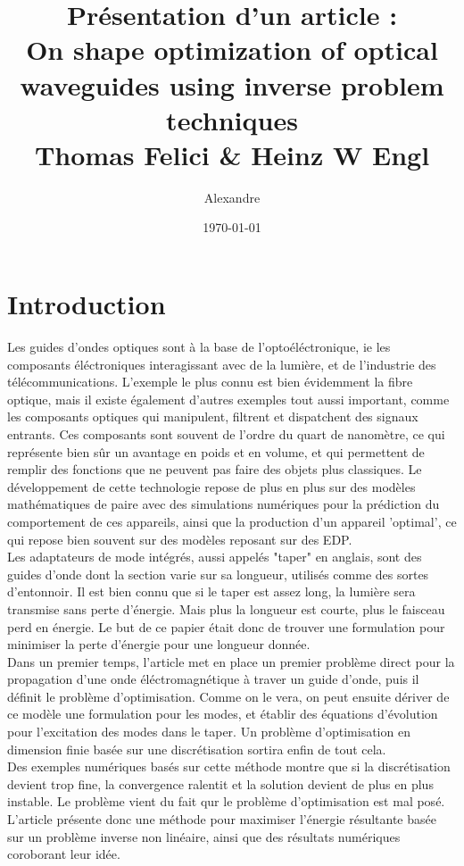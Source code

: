 \documentclass{article}
\title{Pr\'esentation d'un article : \\ On shape optimization of optical waveguides using inverse problem techniques\\\small{Thomas Felici \& Heinz W Engl}}
\author{Alexandre \bsc{Vieira}}
\date{\today}
\begin{document}
\maketitle
\tableofcontents

\newpage

\section*{Introduction}
Les guides d'ondes optiques sont à la base de l'optoéléctronique, ie les composants éléctroniques interagissant avec de la lumière, et de l'industrie des télécommunications. L'exemple le plus connu est bien évidemment la fibre optique, mais il existe également d'autres exemples tout aussi important, comme les composants optiques qui manipulent, filtrent et dispatchent des signaux entrants. Ces composants sont souvent de l'ordre du quart de nanomètre, ce qui représente bien sûr un avantage en poids et en volume, et qui permettent de remplir des fonctions que ne peuvent pas faire des objets plus classiques. Le développement de cette technologie repose de plus en plus sur des modèles mathématiques de paire avec des simulations numériques pour la prédiction du comportement de ces appareils, ainsi que la production d'un appareil 'optimal', ce qui repose bien souvent sur des modèles reposant sur des EDP.\\
Les adaptateurs de mode intégrés, aussi appelés "taper" en anglais, sont des guides d'onde dont la section varie sur sa longueur, utilisés comme des sortes d'entonnoir. Il est bien connu que si le taper est assez long, la lumière sera transmise sans perte d'énergie. Mais plus la longueur est courte, plus le faisceau perd en énergie. Le but de ce papier était donc de trouver une formulation pour minimiser la perte d'énergie pour une longueur donnée.\\
Dans un premier temps, l'article met en place un premier problème direct pour la propagation d'une onde éléctromagnétique à traver un guide d'onde, puis il définit le problème d'optimisation. Comme on le vera, on peut ensuite dériver de ce modèle une formulation pour les modes, et établir des équations d'évolution pour l'excitation des modes dans le taper. Un problème d'optimisation en dimension finie basée sur une discrétisation sortira enfin de tout cela. \\
Des exemples numériques basés sur cette méthode montre que si la discrétisation devient trop fine, la convergence ralentit et la solution devient de plus en plus instable. Le problème vient du fait qur le problème d'optimisation est mal posé. L'article présente donc une méthode pour maximiser l'énergie résultante basée sur un problème inverse non linéaire, ainsi que des résultats numériques coroborant leur idée. 
\end{document}
